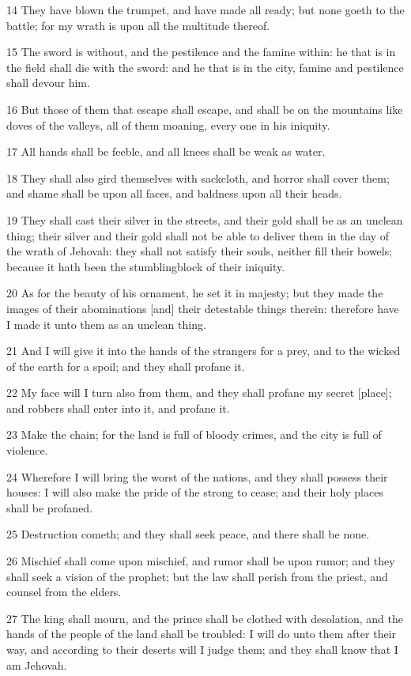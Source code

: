\par 14 They have blown the trumpet, and have made all ready; but none goeth to the battle; for my wrath is upon all the multitude thereof.
\par 15 The sword is without, and the pestilence and the famine within: he that is in the field shall die with the sword: and he that is in the city, famine and pestilence shall devour him.
\par 16 But those of them that escape shall escape, and shall be on the mountains like doves of the valleys, all of them moaning, every one in his iniquity.
\par 17 All hands shall be feeble, and all knees shall be weak as water.
\par 18 They shall also gird themselves with sackcloth, and horror shall cover them; and shame shall be upon all faces, and baldness upon all their heads.
\par 19 They shall cast their silver in the streets, and their gold shall be as an unclean thing; their silver and their gold shall not be able to deliver them in the day of the wrath of Jehovah: they shall not satisfy their souls, neither fill their bowels; because it hath been the stumblingblock of their iniquity.
\par 20 As for the beauty of his ornament, he set it in majesty; but they made the images of their abominations [and] their detestable things therein: therefore have I made it unto them as an unclean thing.
\par 21 And I will give it into the hands of the strangers for a prey, and to the wicked of the earth for a spoil; and they shall profane it.
\par 22 My face will I turn also from them, and they shall profane my secret [place]; and robbers shall enter into it, and profane it.
\par 23 Make the chain; for the land is full of bloody crimes, and the city is full of violence.
\par 24 Wherefore I will bring the worst of the nations, and they shall possess their houses: I will also make the pride of the strong to cease; and their holy places shall be profaned.
\par 25 Destruction cometh; and they shall seek peace, and there shall be none.
\par 26 Mischief shall come upon mischief, and rumor shall be upon rumor; and they shall seek a vision of the prophet; but the law shall perish from the priest, and counsel from the elders.
\par 27 The king shall mourn, and the prince shall be clothed with desolation, and the hands of the people of the land shall be troubled: I will do unto them after their way, and according to their deserts will I judge them; and they shall know that I am Jehovah.

